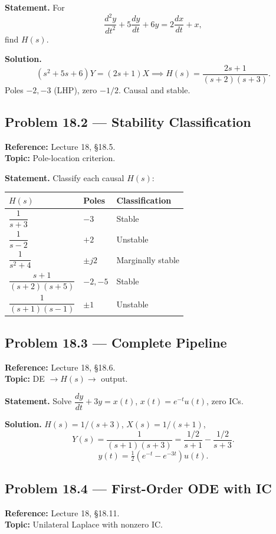 \documentclass[11pt]{article}
\begin{document}
\textbf{Statement.} For
\[
\frac{d^2 y}{dt^2}+5\frac{dy}{dt}+6y = 2\frac{dx}{dt}+x,
\]
find $H(s)$.

\textbf{Solution.}
\[
(s^2+5s+6)Y = (2s+1)X \implies H(s) = \frac{2s+1}{(s+2)(s+3)}.
\]
Poles $-2,-3$ (LHP), zero $-1/2$. Causal and stable.

\subsection{Problem 18.2 --- Stability Classification}
\textbf{Reference:} Lecture 18, \S 18.5.\\
\textbf{Topic:} Pole-location criterion.

\textbf{Statement.} Classify each causal $H(s)$:

\begin{center}
\begin{tabular}{|l|l|l|}
\hline
$H(s)$ & Poles & Classification\\
\hline
$\dfrac{1}{s+3}$ & $-3$ & Stable\\
$\dfrac{1}{s-2}$ & $+2$ & Unstable\\
$\dfrac{1}{s^2+4}$ & $\pm j2$ & Marginally stable\\
$\dfrac{s+1}{(s+2)(s+5)}$ & $-2,-5$ & Stable\\
$\dfrac{1}{(s+1)(s-1)}$ & $\pm 1$ & Unstable\\
\hline
\end{tabular}
\end{center}

\subsection{Problem 18.3 --- Complete Pipeline}
\textbf{Reference:} Lecture 18, \S 18.6.\\
\textbf{Topic:} DE $\to H(s)\to$ output.

\textbf{Statement.} Solve $\dfrac{dy}{dt}+3y = x(t)$, $x(t)=e^{-t}u(t)$, zero ICs.

\textbf{Solution.} $H(s) = 1/(s+3)$, $X(s)=1/(s+1)$,
\[
Y(s) = \frac{1}{(s+1)(s+3)} = \frac{1/2}{s+1}-\frac{1/2}{s+3}.
\]
\[
\boxed{y(t) = \tfrac{1}{2}\left(e^{-t}-e^{-3t}\right)u(t)}.
\]

\subsection{Problem 18.4 --- First-Order ODE with IC}
\textbf{Reference:} Lecture 18, \S 18.11.\\
\textbf{Topic:} Unilateral Laplace with nonzero IC.
\end{document}

